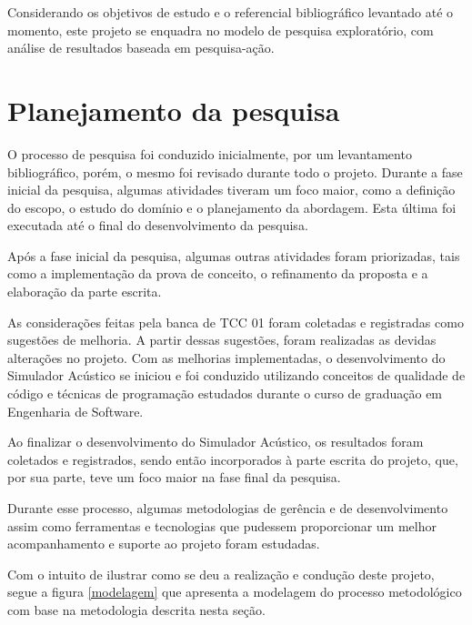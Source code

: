 Considerando os objetivos de estudo e o referencial bibliográfico levantado até o momento, este projeto se enquadra no modelo de pesquisa exploratório, com análise de resultados baseada em pesquisa-ação.

\section{Planejamento da pesquisa}

O processo de pesquisa foi conduzido inicialmente, por um levantamento bibliográfico, porém, o mesmo foi revisado durante todo o projeto. Durante a fase inicial da pesquisa, algumas atividades tiveram um foco maior, como a definição do escopo, o estudo do domínio e o planejamento da abordagem. Esta última foi executada até o final do desenvolvimento da pesquisa.

Após a fase inicial da pesquisa, algumas outras atividades foram priorizadas, tais como a implementação da prova de conceito, o refinamento da proposta e a elaboração da parte escrita.

As considerações feitas pela banca de TCC 01 foram coletadas e registradas como sugestões de melhoria. A partir dessas sugestões, foram realizadas as devidas alterações no projeto. Com as melhorias implementadas, o desenvolvimento do Simulador Acústico se iniciou e foi conduzido utilizando conceitos de qualidade de código e técnicas de programação estudados durante o curso de graduação em Engenharia de Software.

Ao finalizar o desenvolvimento do Simulador Acústico, os resultados foram coletados e registrados, sendo então incorporados à parte escrita do projeto, que, por sua parte, teve um foco maior na fase final da pesquisa.

Durante esse processo, algumas metodologias de gerência e de desenvolvimento assim como ferramentas e tecnologias que pudessem proporcionar um melhor acompanhamento e suporte ao projeto foram estudadas.


Com o intuito de ilustrar como se deu a realização e condução deste projeto, segue a figura \ref{modelagem} que apresenta a modelagem do processo metodológico com base na metodologia descrita nesta seção.


